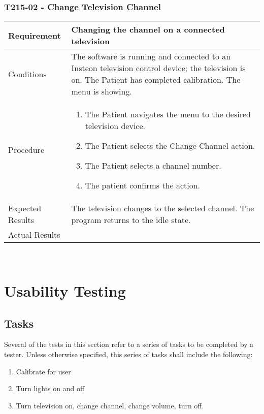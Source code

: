 \documentclass{article}
\begin{document}
\subsubsection{T215-02 - Change Television Channel}
\begin{tabular}{| l | p{12cm} |}
    \hline
	Requirement & Changing the channel on a connected television \\ \hline
	Conditions & The software is running and connected to an Insteon
	television control device; the television is on. The Patient has completed
	calibration. The menu is showing. \\
	\hline
	Procedure &
\begin{enumerate}
	\item The Patient navigates the menu to the desired television device.
	\item The Patient selects the Change Channel action.
	\item The Patient selects a channel number.
	\item The patient confirms the action.
\end{enumerate} \\ \hline
	Expected Results & The television changes to the selected channel. The
    program returns to the idle state. \\ \hline
	Actual Results & \vspace{1cm} \\ \hline
\end{tabular}

\hfill \\

\newpage

\section{Usability Testing}
\subsection{Tasks}

Several of the tests in this section refer to a series of tasks to be
completed by a tester. Unless otherwise specified, this series of tasks shall
include the following:

\begin{enumerate}
	\item Calibrate for user
	\item Turn lights on and off
	\item Turn television on, change channel, change volume, turn off.
\end{enumerate}
\end{document}
